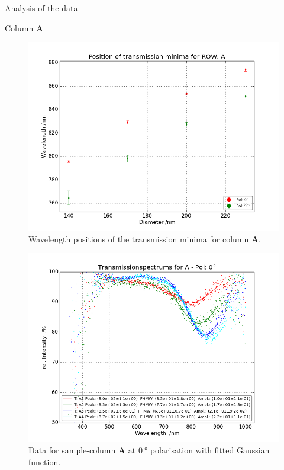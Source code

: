 \documentclass[pdftex, a4paper,11pt, twoside, UKenglish]{report}
\begin{document}
\begin{chapter}{Analysis of the data}
\begin{section}{Column \textbf{A}}
      \begin{figure}[b!]
        \centering
        \includegraphics[width=\textwidth]{Figures/MinimaPosA.png}
        \caption{Wavelength positions of the transmission minima for column
            \textbf{A}.}
        \label{fig:MinimaPosA}
      \end{figure}
      \newpage
      \begin{figure}[ht!]
        \centering
        \begin{minipage}{.95\textwidth}
          \centering
          \includegraphics[width=\textwidth]
              {Figures/TransspecFIT_APol0.png}
          \caption{Data for sample-column \textbf{A} at $\SI{0}{\degree}$
              polarisation with fitted Gaussian function.}

\end{minipage}
\end{figure}
\end{section}
\end{chapter}
\end{document}
